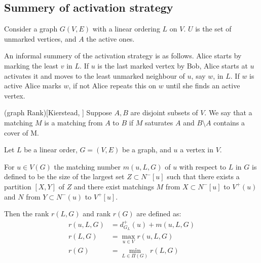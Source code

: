 \subsection{Summery of activation strategy}

Consider a graph $G(V,E)$ with a linear ordering $L$ on $V$. $U$ is the set of unmarked vertices, and $A$ the active ones.

An informal summery of the activation strategy is as follows. Alice starts by marking the least $v$ in $L$. If $u$ is the last marked vertex by Bob, Alice starts at $u$ activates it and moves to the least unmarked neighbour of $u$, say $w$, in $L$. If $w$ is active Alice marks $w$, if not Alice repeats this on $w$ until she finds an active vertex.

\begin{definition}(graph Rank)[Kierstead, \cite{KIERSTEAD2000}] \label{defnRank}
    Suppose $A,B$ are disjoint subsets of $V$. We say that a matching $M$ is a matching from $A$ to $B$ if $M$ saturates $A$ and $B\setminus A$ contains a cover of M. 
    
    Let $L$ be a linear order, $G=(V,E)$ be a graph, and $u$ a vertex in $V$.
        
    For $u \in V(G)$ the matching number $m(u, L, G)$ of $u$ with respect to $L$ in $G$ is defined to be the size of the largest set $Z \subset N^-[u]$ such that there exists a partition $[X, Y]$ of $Z$ and there exist matchings $M$ from
    $X\subset N^-[u]$ to $V^+(u)$ and $N$ from $Y\subset N^-(u)$ to $V^+[u]$.
    
    Then the rank $r(L,G)$ and rank $r(G)$ are defined as:
    \begin{align*}
    	r(u,L,G) & = d^+_{G_L}(u) + m(u,L,G) \\
    	r(L,G)   & = \max_{u \in V}r(u,L,G)  \\
    	r(G)     & = \min_{L \in \Pi(G)} r(L,G)
    \end{align*}
\end{definition}

